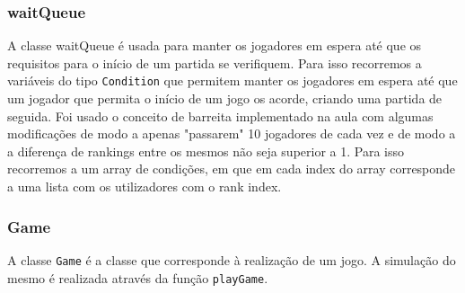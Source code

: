 \documentclass{article}
\begin{document}
\subsubsection{waitQueue}
A classe waitQueue é usada para manter os jogadores em espera até que os requisitos para o início de um partida se verifiquem. Para isso recorremos a variáveis do tipo
\texttt{Condition} que permitem manter os jogadores em espera até que um jogador que permita o início de um jogo os acorde, criando uma partida de seguida. Foi usado o conceito de barreita implementado na aula com algumas modificações de modo a apenas "passarem" 10 jogadores de cada vez e de modo a a diferença de rankings entre os mesmos não seja superior a 1. Para isso recorremos a um array de condições, em que em cada index do array corresponde a uma lista com os utilizadores com o rank index. 

\subsubsection{Game}
A classe \texttt{Game} é a classe que corresponde à realização de um jogo. A simulação do mesmo é realizada através da função \texttt{playGame}.
\end{document}
